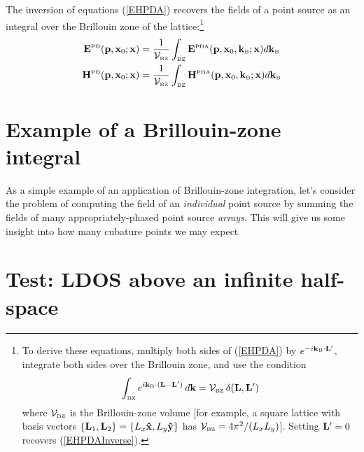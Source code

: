 \documentclass[letterpaper]{article}
\begin{document}
The inversion of equations (\ref{EHPDA}) recovers the fields
of a point source as an integral over the Brillouin zone of the 
lattice:\footnote{To derive these equations, multiply both sides
of (\ref{EHPDA}) by $e^{-i\mathbf{k}_{\hbox{\tiny{B}}} \cdot \mathbf{L}^\prime}$,
integrate both sides over the Brillouin zone, and use the
condition 
$$\int_{\hbox{\tiny{BZ}}} e^{i\mathbf{k}_{\hbox{\tiny{B}}}\cdot (\mathbf{L}-\mathbf{L}^\prime)}\,d\mathbf{k}
  =\mathcal{V}_{\hbox{\tiny{BZ}}} \, \delta(\mathbf{L},\mathbf{L}^\prime)
$$
where $\mathcal{V}_{\hbox{\tiny{BZ}}}$ is the Brillouin-zone volume [for example,
a square lattice with basis vectors
$\{\mathbf{L}_1, \mathbf{L}_2\}=\{L_x\mathbf{\hat x}, L_y\mathbf{\hat y}\}$ has
$\mathcal{V}_{\hbox{\tiny{BZ}}}=4\pi^2/(L_x L_y)$].
Setting $\mathbf{L}^\prime=0$ recovers (\ref{EHPDAInverse}).}
\begin{subequations}
\begin{align}
  \mathbf{E}^{\hbox{\tiny{PD}}}(\mathbf{p}, \mathbf{x}_0; \mathbf{x})
&=\frac{1}{\mathcal{V}_{\hbox{\tiny{BZ}}}} 
   \int_{\hbox{\tiny{BZ}}} \mathbf{E}^{\hbox{\tiny{PDA}}}(\mathbf{p}, \mathbf{x}_0, \mathbf{k}_{\hbox{\tiny{B}}}; \mathbf{x}) 
   d\mathbf{k}_{\hbox{\tiny{B}}}
\\
  \mathbf{H}^{\hbox{\tiny{PD}}}(\mathbf{p}, \mathbf{x}_0; \mathbf{x})
&=\frac{1}{\mathcal{V}_{\hbox{\tiny{BZ}}}} 
   \int_{\hbox{\tiny{BZ}}} \mathbf{H}^{\hbox{\tiny{PDA}}}(\mathbf{p}, \mathbf{x}_0, \mathbf{k}_{\hbox{\tiny{B}}}; \mathbf{x}) 
   d\mathbf{k}_{\hbox{\tiny{B}}}
\end{align}
\label{EHPDAInverse}
\end{subequations}

\newpage
\section{Example of a Brillouin-zone integral}

As a simple example of an application of Brillouin-zone integration,
let's consider the problem of computing the field of an
\textit{individual} point source by summing the fields of
many appropriately-phased point source \textit{arrays}.
This will give us some insight into how many cubature points we 
may expect

\newpage
\section{Test: LDOS above an infinite half-space}
\end{document}
